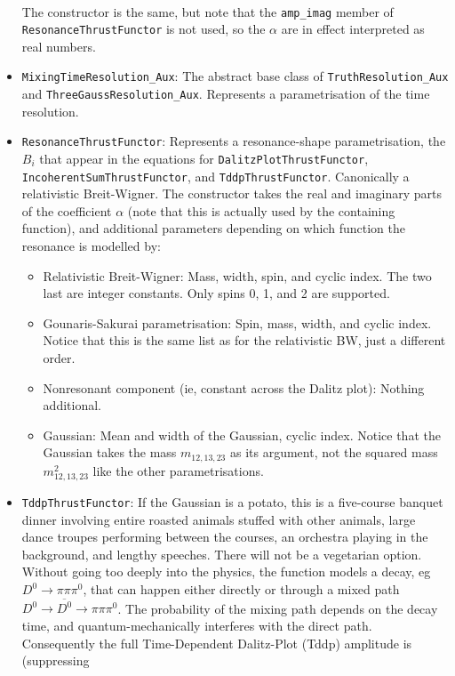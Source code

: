 \documentclass[12pt,pdflatex]{article}
\begin{document}
\begin{itemize}
\begin{eqnarray}
\end{eqnarray}
The constructor is the same, but note that the \texttt{amp\_imag} member of \texttt{ResonanceThrustFunctor}
is not used, so the $\alpha$ are in effect interpreted as real numbers. 
\item \texttt{MixingTimeResolution\_Aux}: The abstract base class of \texttt{TruthResolution\_Aux}
and \texttt{ThreeGaussResolution\_Aux}. Represents a parametrisation of the time resolution. 
\item \texttt{ResonanceThrustFunctor}: Represents a resonance-shape parametrisation, the $B_i$
that appear in the equations for \texttt{DalitzPlotThrustFunctor}, \texttt{IncoherentSumThrustFunctor},
and \texttt{TddpThrustFunctor}. Canonically a relativistic Breit-Wigner. The constructor takes
the real and imaginary parts of the coefficient $\alpha$ (note that this is actually used by
the containing function), and additional parameters depending on which function the resonance
is modelled by:
\begin{itemize}
\item Relativistic Breit-Wigner: Mass, width, spin, and cyclic index. The two last are integer constants.
Only spins 0, 1, and 2 are supported. 
\item Gounaris-Sakurai parametrisation: Spin, mass, width, and cyclic index. Notice that this
is the same list as for the relativistic BW, just a different order.
\item Nonresonant component (ie, constant across the Dalitz plot): Nothing additional.
\item Gaussian: Mean and width of the Gaussian, cyclic index. Notice that the Gaussian
takes the mass $m_{12,13,23}$ as its argument, not the squared mass $m^2_{12,13,23}$
like the other parametrisations. 
\end{itemize}
\item \texttt{TddpThrustFunctor}: If the Gaussian is a potato, this is a five-course banquet
dinner involving entire roasted animals stuffed with other animals, large dance troupes 
performing between the courses, an orchestra playing in the background, and lengthy
speeches. There will not be a vegetarian option. Without going too deeply into the physics, 
the function models a decay, eg $D^0\to\pi\pi\pi^0$, that can happen either directly or
through a mixed path $D^0\to \overline{D^0}\to\pi\pi\pi^0$. The probability of the mixing
path depends on the decay time, and quantum-mechanically interferes with the direct path.
Consequently the full Time-Dependent Dalitz-Plot (Tddp) amplitude is (suppressing

\end{itemize}
\end{document}
